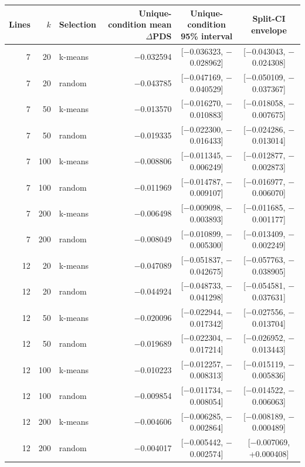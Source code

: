 \documentclass[12pt]{article}
\begin{document}
\begin{singlespace}
\vspace{6pt}
{\scriptsize
\setlength{\tabcolsep}{3pt}
\renewcommand{\arraystretch}{1.1}
\begin{tabular}{@{}rrlrcc@{}}
\toprule
Lines & $k$ & Selection & \makecell{Unique-condition\\mean $\Delta$PDS} & \makecell{Unique-condition\\95\% interval} & \makecell{Split-CI\\envelope} \\
\midrule
7 & 20 & k-means & $-$0.032594 & [$-$0.036323, $-$0.028962] & [$-$0.043043, $-$0.024308] \\
7 & 20 & random & $-$0.043785 & [$-$0.047169, $-$0.040529] & [$-$0.050109, $-$0.037367] \\
7 & 50 & k-means & $-$0.013570 & [$-$0.016270, $-$0.010883] & [$-$0.018058, $-$0.007675] \\
7 & 50 & random & $-$0.019335 & [$-$0.022300, $-$0.016433] & [$-$0.024286, $-$0.013014] \\
7 & 100 & k-means & $-$0.008806 & [$-$0.011345, $-$0.006249] & [$-$0.012877, $-$0.002873] \\
7 & 100 & random & $-$0.011969 & [$-$0.014787, $-$0.009107] & [$-$0.016977, $-$0.006070] \\
7 & 200 & k-means & $-$0.006498 & [$-$0.009098, $-$0.003893] & [$-$0.011685, $-$0.001177] \\
7 & 200 & random & $-$0.008049 & [$-$0.010899, $-$0.005300] & [$-$0.013409, $-$0.002249] \\
\midrule
12 & 20 & k-means & $-$0.047089 & [$-$0.051837, $-$0.042675] & [$-$0.057763, $-$0.038905] \\
12 & 20 & random & $-$0.044924 & [$-$0.048733, $-$0.041298] & [$-$0.054581, $-$0.037631] \\
12 & 50 & k-means & $-$0.020096 & [$-$0.022944, $-$0.017342] & [$-$0.027556, $-$0.013704] \\
12 & 50 & random & $-$0.019689 & [$-$0.022304, $-$0.017214] & [$-$0.026952, $-$0.013443] \\
12 & 100 & k-means & $-$0.010223 & [$-$0.012257, $-$0.008313] & [$-$0.015119, $-$0.005836] \\
12 & 100 & random & $-$0.009854 & [$-$0.011734, $-$0.008054] & [$-$0.014522, $-$0.006063] \\
12 & 200 & k-means & $-$0.004606 & [$-$0.006285, $-$0.002864] & [$-$0.008189, $-$0.000489] \\
12 & 200 & random & $-$0.004017 & [$-$0.005442, $-$0.002574] & [$-$0.007069, +0.000408] \\
\bottomrule
\end{tabular}
}


\end{singlespace}
\end{document}
